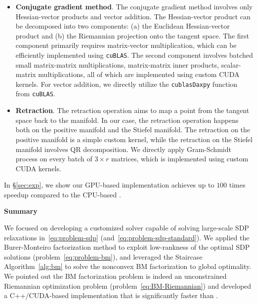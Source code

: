 \begin{itemize}
    \item \textbf{Conjugate gradient method}.
    The conjugate gradient method involves only Hessian-vector products and vector addition. The Hessian-vector product can be decomposed into two components: (a) the Euclidean Hessian-vector product and (b) the Riemannian projection onto the tangent space. The first component primarily requires matrix-vector multiplication, which can be efficiently implemented using \texttt{cuBLAS}. The second component involves batched small matrix-matrix multiplications, matrix-matrix inner products, scalar-matrix multiplications, all of which are implemented using custom CUDA kernels. For vector addition, we directly utilize the \texttt{cublasDaxpy} function from \texttt{cuBLAS}.

    \item \textbf{Retraction}. The retraction operation aims to map a point from the tangent space back to the manifold. In our case, the retraction operation happens both on the positive manifold and the Stiefel manifold. The retraction on the positive manifold is a simple custom kernel, while the retraction on the Stiefel manifold involves QR decomposition. We directly apply Gram-Schmidt process on every batch of $3 \times r$ matrices, which is implemented using custom CUDA kernels.
\end{itemize}

In \S\ref{sec:exp}, we show our GPU-based implementation achieves up to $100$ times speedup compared to the CPU-based \manopt.

\begin{tcolorbox}
    \begin{center}
        \vspace{-1mm}
        \textbf{Summary}
        \vspace{-1mm}
    \end{center} 
    We focused on developing a customized solver capable of solving large-scale SDP relaxations in~\eqref{eq:problem-sdp} (and~\eqref{eq:problem-sdp-standard}). We applied the Burer-Monteiro factorization method to exploit low-rankness of the optimal SDP solutions (\cf problem~\eqref{eq:problem-bm}), and leveraged the Staircase Algorithm~\ref{alg:bm} to solve the nonconvex BM factorization to global optimality. We pointed out the BM factorization problem is indeed an unconstrained Riemannian optimization problem (\cf problem~\eqref{eq:BM-Riemannian}) and developed a C++/CUDA-based implementation that is significantly faster than \manopt.
\end{tcolorbox}

